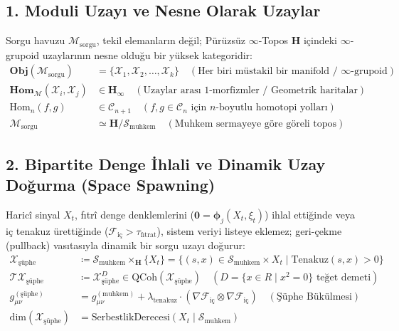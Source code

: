 \documentclass[11pt, a4paper]{article}
\begin{document}
\subsection{1. Moduli Uzayı ve Nesne Olarak Uzaylar}
Sorgu havuzu $\mathcal{M}_{\text{sorgu}}$, tekil elemanların değil; Pürüzsüz $\infty$-Topos $\mathbf{H}$ içindeki $\infty$-grupoid uzaylarının nesne olduğu bir yüksek kategoridir:
\begin{align}
\mathbf{Obj}(\mathcal{M}_{\text{sorgu}}) &= \{ \mathcal{X}_1, \mathcal{X}_2, \dots, \mathcal{X}_k \} \quad (\text{Her biri müstakil bir manifold / } \infty\text{-grupoid}) \\
\mathbf{Hom}_{\mathcal{M}}(\mathcal{X}_i, \mathcal{X}_j) &\in \mathbf{H}_{\infty} \quad (\text{Uzaylar arası 1-morfizmler / Geometrik haritalar}) \\
\text{Hom}_n(f, g) &\in \mathcal{C}_{n+1} \quad (f, g \in \mathcal{C}_n \text{ için } n\text{-boyutlu homotopi yolları}) \\
\mathcal{M}_{\text{sorgu}} &\simeq \mathbf{H} / \mathcal{S}_{\text{muhkem}} \quad (\text{Muhkem sermayeye göre göreli topos})
\end{align}

\subsection{2. Bipartite Denge İhlali ve Dinamik Uzay Doğurma (Space Spawning)}
Haricî sinyal $X_t$, fıtrî denge denklemlerini ($\mathbf{0} = \bm{\phi}_j(X_t, \xi_t)$) ihlal ettiğinde veya iç tenakuz ürettiğinde ($\mathcal{F}_{\text{iç}} > \tau_{\text{fıtrat}}$), sistem veriyi listeye eklemez; geri-çekme (pullback) vasıtasıyla dinamik bir sorgu uzayı doğurur:
\begin{align}
\mathcal{X}_{\text{şüphe}} &\coloneqq \mathcal{S}_{\text{muhkem}} \times_{\mathbf{H}} \{ X_t \} = \{ (s, x) \in \mathcal{S}_{\text{muhkem}} \times X_t \mid \text{Tenakuz}(s, x) > 0 \} \\
\mathcal{T}\mathcal{X}_{\text{şüphe}} &\coloneqq \mathcal{X}_{\text{şüphe}}^D \in \text{QCoh}(\mathcal{X}_{\text{şüphe}}) \quad (D = \{x \in R \mid x^2 = 0\} \text{ teğet demeti}) \\
g_{\mu\nu}^{(\text{şüphe})} &= g_{\mu\nu}^{(\text{muhkem})} + \lambda_{\text{tenakuz}} \cdot \left( \nabla \mathcal{F}_{\text{iç}} \otimes \nabla \mathcal{F}_{\text{iç}} \right) \quad (\text{Şüphe Bükülmesi}) \\
\text{dim}\left( \mathcal{X}_{\text{şüphe}} \right) &= \text{SerbestlikDerecesi}\left( X_t \mid \mathcal{S}_{\text{muhkem}} \right)
\end{align}
\end{document}
